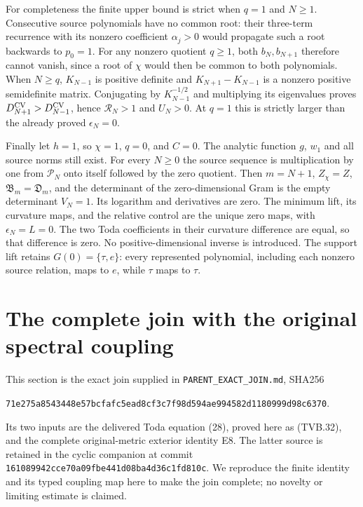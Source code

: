 \documentclass[11pt]{article}
\begin{document}
For completeness the finite upper bound is strict when $q=1$ and
$N\ge1$. Consecutive source polynomials have no common root:
their three-term recurrence with its nonzero coefficient
$\alpha_j>0$ would propagate such a root backwards to $p_0=1$.
For any nonzero quotient $q\ge1$, both $b_N,b_{N+1}$ therefore
cannot vanish, since a root of $\chi$ would then be common to
both polynomials. When $N\ge q$, $K_{N-1}$ is positive definite
and $K_{N+1}-K_{N-1}$ is a nonzero positive semidefinite matrix.
Conjugating by $K_{N-1}^{-1/2}$ and multiplying its eigenvalues
proves $D_{N+1}^{\rm CV}>D_{N-1}^{\rm CV}$, hence
$\mathcal R_N>1$ and $U_N>0$. At $q=1$ this is strictly larger
than the already proved $\epsilon_N=0$.

Finally let $h=1$, so $\chi=1$, $q=0$, and $C=0$.
The analytic function $g$, $w_1$ and all source norms still exist.
For every $N\ge0$ the source sequence is multiplication by one
from $\mathcal P_N$ onto itself followed by the zero quotient.
Then $m=N+1$, $Z_\chi=Z$, $\mathfrak B_m=\mathfrak D_m$,
and the determinant of the zero-dimensional Gram is the empty
determinant $V_N=1$. Its logarithm and derivatives are zero.
The minimum lift, its curvature maps, and the relative control
are the unique zero maps, with $\epsilon_N=L=0$.
The two Toda coefficients in their curvature difference are equal,
so that difference is zero. No positive-dimensional inverse is
introduced. The support lift retains $G(0)=\{\tau,e\}$:
every represented polynomial, including each nonzero source
relation, maps to $e$, while $\tau$ maps to $\tau$.

\section{The complete join with the original spectral coupling}

This section is the exact join supplied in
\texttt{PARENT\_EXACT\_JOIN.md}, SHA256
\begin{center}\footnotesize
\texttt{71e275a8543448e57bcfafc5ead8cf3c7f98d594ae994582d1180999d98c6370}.
\end{center}
Its two inputs are the delivered Toda equation (28), proved here
as (TVB.32), and the complete original-metric exterior identity E8.
The latter source is retained in the cyclic companion at commit
\texttt{161089942cce70a09fbe441d08ba4d36c1fd810c}. We reproduce
the finite identity and its typed coupling map here to make the
join complete; no novelty or limiting estimate is claimed.
\end{document}
